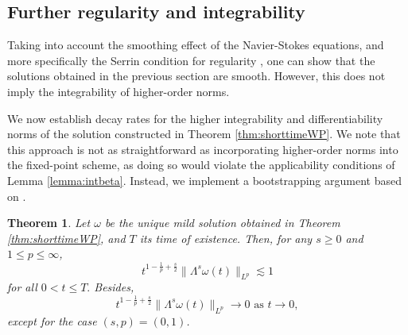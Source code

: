 \documentclass[11pt,a4paper]{article}
\newcommand{\w}{\omega}
\newtheorem{thm}{Theorem}[section]
\begin{document}
\subsection{Further regularity and integrability}\label{sec:furtherregularity}

Taking into account the smoothing effect of the Navier-Stokes equations, and more specifically the Serrin condition for regularity \cite{RobinsonRodrigoSadowski16}, one can show that the solutions obtained in the previous section are smooth. However, this does not imply the integrability of higher-order norms.


We now establish decay rates for the higher integrability and differentiability norms of the solution constructed in Theorem \ref{thm:shorttimeWP}. We note that this approach is not as straightforward as incorporating higher-order norms into the fixed-point scheme, as doing so would violate the applicability conditions of Lemma \ref{lemma:intbeta}. Instead, we implement a bootstrapping argument based on \cite{dongli2009}.



\begin{thm}\label{thm:higherregrate}
Let $\w$ be the unique mild solution obtained in Theorem \ref{thm:shorttimeWP}, and $T$ its time of existence. Then, for any $s\geq 0$ and $1\leq p\leq  \infty$,
\begin{equation}\label{eq:scalingsolutionhigherregularity}
t^{1-\frac{1}{p}+\frac{s}{2}}\|\Lambda^s\w(t)\|_{L^p}\lesssim 1  
\end{equation}
for all $0<t\leq T.$ Besides, 
\begin{equation}\label{convergecetozero}
t^{1-\frac{1}{p}+\frac{s}{2}}\| \Lambda^s\w(t)\|_{L^p}\to 0 \text{ as }t\to 0, 
\end{equation}
except for the case $(s,p)=(0,1)$.
\end{thm}
\end{document}
